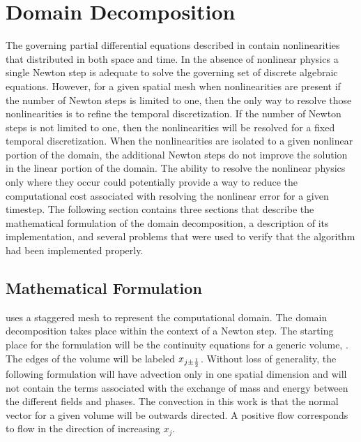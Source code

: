 \chapter{Domain Decomposition}
\label{chap:domain_decomposition}
The governing partial differential equations described in  contain nonlinearities that distributed in both space and time.
In the absence of nonlinear physics a single Newton step is adequate to solve the governing set of discrete algebraic equations.
However, for a given spatial mesh when nonlinearities are present if the number of Newton steps is limited to one, then the only way to resolve those nonlinearities is to refine the temporal discretization.
If the number of Newton steps is not limited to one, then the nonlinearities will be resolved for a fixed temporal discretization.
When the nonlinearities are isolated to a given nonlinear portion of the domain, the additional Newton steps do not improve the solution in the linear portion of the domain.
The ability to resolve the nonlinear physics only where they occur could potentially provide a way to reduce the computational cost associated with resolving the nonlinear error for a given timestep.
The following section contains three sections that describe the mathematical formulation of the domain decomposition, a description of its implementation, and several problems that were used to verify that the algorithm had been implemented properly.

\section{Mathematical Formulation}
\label{sec:dd_math}

\cobra{} uses a staggered mesh to represent the computational domain.
The domain decomposition takes place within the context of a Newton step.
The starting place for the formulation will be the continuity equations for a generic volume,  .
The edges of the volume will be labeled $x_{j \pm \onehalf}$.
Without loss of generality, the following formulation will have advection only in one spatial dimension and will not contain the terms associated with the exchange of mass and energy between the different fields and phases.
The convection in this work is that the normal vector for a given volume will be outwards directed.
A positive flow corresponds to flow in the direction of increasing $x_{j}$.  

